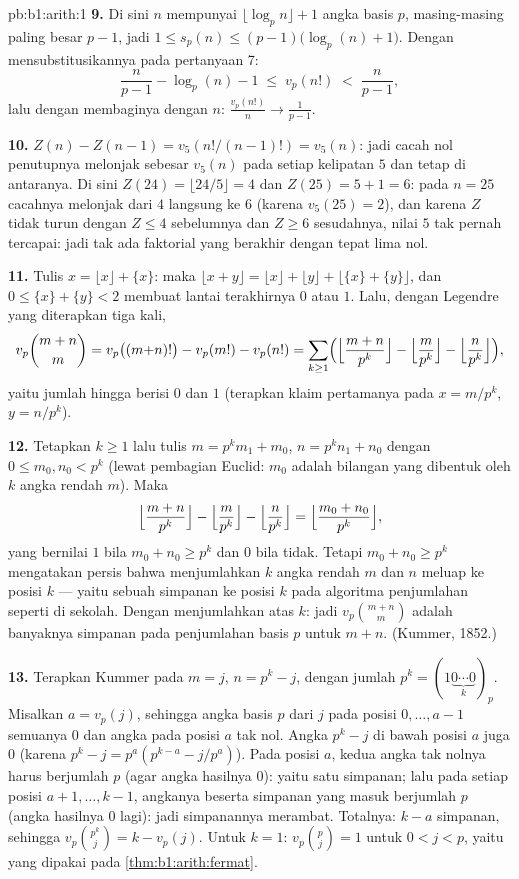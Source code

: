 \begin{solution}{pb:b1:arith:1}
\textbf{9.} Di sini $n$ mempunyai $\lfloor \log_p n \rfloor + 1$ angka
basis $p$, masing-masing paling besar $p - 1$, jadi $1 \leq s_p(n) \leq
(p-1)\bigl(\log_p(n) + 1\bigr)$. Dengan mensubstitusikannya pada pertanyaan 7:
\[
\frac n{p-1} - \log_p(n) - 1 \;\leq\; v_p(n!) \;<\; \frac n{p-1},
\]
lalu dengan membaginya dengan $n$: $\frac{v_p(n!)}n \to \frac1{p-1}$.

\textbf{10.} $Z(n) - Z(n-1) = v_5(n!/(n-1)!) = v_5(n)$: jadi cacah
nol penutupnya melonjak sebesar $v_5(n)$ pada setiap kelipatan $5$ dan
tetap di antaranya. Di sini $Z(24) = \lfloor24/5\rfloor = 4$ dan $Z(25) =
5 + 1 = 6$: pada $n = 25$ cacahnya melonjak dari $4$ langsung ke $6$
(karena $v_5(25) = 2$), dan karena $Z$ tidak turun dengan $Z \leq 4$
sebelumnya dan $Z \geq 6$ sesudahnya, nilai $5$ tak pernah tercapai: jadi tak ada
faktorial yang berakhir dengan tepat lima nol.

\textbf{11.} Tulis $x = \lfloor x\rfloor + \{x\}$: maka $\lfloor x +
y\rfloor = \lfloor x\rfloor + \lfloor y\rfloor + \lfloor \{x\} +
\{y\}\rfloor$, dan $0 \leq \{x\} + \{y\} < 2$ membuat lantai terakhirnya
$0$ atau $1$. Lalu, dengan Legendre yang diterapkan tiga kali,
\[
v_p\binom{m+n}m = v_p\bigl((m{+}n)!\bigr) - v_p(m!) - v_p(n!)
= \sum_{k\geq1}\Bigl(
\Bigl\lfloor\frac{m+n}{p^k}\Bigr\rfloor
- \Bigl\lfloor\frac{m}{p^k}\Bigr\rfloor
- \Bigl\lfloor\frac{n}{p^k}\Bigr\rfloor\Bigr),
\]
yaitu jumlah hingga berisi $0$ dan $1$ (terapkan klaim pertamanya pada $x =
m/p^k$, $y = n/p^k$).

\textbf{12.} Tetapkan $k \geq 1$ lalu tulis $m = p^km_1 + m_0$, $n =
p^kn_1 + n_0$ dengan $0 \leq m_0, n_0 < p^k$ (lewat pembagian Euclid:
$m_0$ adalah bilangan yang dibentuk oleh $k$ angka rendah $m$). Maka
\[
\Bigl\lfloor\frac{m+n}{p^k}\Bigr\rfloor
- \Bigl\lfloor\frac m{p^k}\Bigr\rfloor
- \Bigl\lfloor\frac n{p^k}\Bigr\rfloor
= \Bigl\lfloor\frac{m_0 + n_0}{p^k}\Bigr\rfloor ,
\]
yang bernilai $1$ bila $m_0 + n_0 \geq p^k$ dan $0$ bila tidak. Tetapi $m_0 +
n_0 \geq p^k$ mengatakan persis bahwa menjumlahkan $k$ angka rendah $m$
dan $n$ meluap ke posisi $k$ --- yaitu sebuah simpanan ke posisi $k$
pada algoritma penjumlahan seperti di sekolah. Dengan menjumlahkan atas $k$:
jadi $v_p\binom{m+n}m$ adalah banyaknya simpanan pada penjumlahan basis $p$
untuk $m + n$. (Kummer, 1852.)

\textbf{13.} Terapkan Kummer pada $m = j$, $n = p^k - j$, dengan jumlah $p^k =
(1\underbrace{0\cdots0}_{k})_p$. Misalkan $a = v_p(j)$, sehingga angka
basis $p$ dari $j$ pada posisi $0, \dots, a-1$ semuanya $0$ dan angka
pada posisi $a$ tak nol. Angka $p^k - j$ di bawah posisi
$a$ juga $0$ (karena $p^k - j = p^a(p^{k-a} - j/p^a)$). Pada posisi
$a$, kedua angka tak nolnya harus berjumlah $p$ (agar angka hasilnya $0$):
yaitu satu simpanan; lalu pada setiap posisi $a+1, \dots, k-1$, angkanya beserta
simpanan yang masuk berjumlah $p$ (angka hasilnya $0$ lagi): jadi simpanannya
merambat. Totalnya: $k - a$ simpanan, sehingga $v_p\binom{p^k}j = k -
v_p(j)$. Untuk $k = 1$: $v_p\binom pj = 1$ untuk $0 < j < p$, yaitu
 yang dipakai pada \cref{thm:b1:arith:fermat}.


\end{solution}
